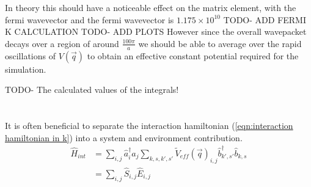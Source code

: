 In theory this should have a noticeable
effect on the matrix element, with the
fermi wavevector
and the fermi wavevector is \(1.175\times{}10^{10}\) TODO- ADD FERMI K CALCULATION
TODO- ADD PLOTS
However since the overall wavepacket decays over a region
of around \(\frac{100\pi}{a}\) we should be
able to average over the rapid oscillations of
\(V(\vec{q})\) to obtain an effective constant
potential required for the simulation.

TODO- The calculated values of the integrals!

\section{}
It is often beneficial to separate the interaction
hamiltonian (\cref{eqn:interaction hamiltonian in k})
into a system and environment contribution.
\begin{align}
    \hat{H}_{int} & = \sum_{i,j} \hat{a}^\dagger_{i}\hat{a}_{j}
    \sum_{k,s,k',s'} {\tilde{V}_{eff}(\vec{q})}_{i,j}
    \hat{b}^\dagger_{k',s'}\hat{b}_{k,s}                                                              \\
                  & = \sum_{i,j} \hat{S}_{i,j} \hat{E}_{i,j}\label{eqn:split interaction hamiltonian}
\end{align}